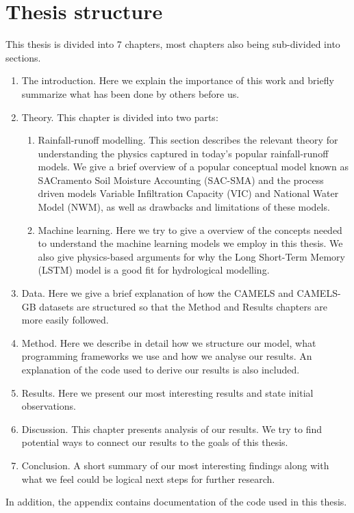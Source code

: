 \section{Thesis structure}
This thesis is divided into 7 chapters, most chapters also being sub-divided into
sections. 
\begin{enumerate}
\item  The introduction. Here we explain the importance of this work and briefly summarize what has been done by others before us.
\item Theory. This chapter is divided into two parts:
    \begin{enumerate}
    \item Rainfall-runoff modelling. This section describes the relevant theory 
        for understanding the physics captured in today's popular rainfall-runoff 
            models. We give a brief overview of a popular conceptual model known 
            as SACramento Soil Moisture Accounting (SAC-SMA) and 
            the process driven models Variable Infiltration Capacity (VIC) and 
            National Water Model (NWM), as well as drawbacks and limitations 
            of these models. 
    \item Machine learning. Here we try to give a overview of the concepts 
        needed to understand the machine learning models we employ in this thesis. 
            We also give physics-based arguments for why the Long Short-Term Memory 
            (LSTM) model is a good fit for hydrological modelling.
    \end{enumerate}
    \item Data. Here we give a brief explanation of how the CAMELS and CAMELS-GB 
    datasets are structured so that the Method and Results chapters are more easily followed.
    \item Method. Here we describe in detail how we structure our model, what programming 
        frameworks we use and how we analyse our results. An explanation of the 
        code used to derive our results is also included.
    \item Results. Here we present our most interesting results and state initial 
        observations.
    \item Discussion. This chapter presents analysis of our results. We try to 
        find potential ways to connect our results to the goals of this thesis.
    \item Conclusion. A short summary of our most interesting findings along with 
        what we feel could be logical next steps for further research.
\end{enumerate}
In addition, the appendix contains documentation of the code used in this thesis.
\nocite{4160265}
\nocite{mckinney-proc-scipy-2010}
\nocite{2020NumPy-Array}
\nocite{2020SciPy-NMeth}
\nocite{NEURIPS2019_9015}
\nocite{Prechelt1998}
\nocite{elemstatlearn}
